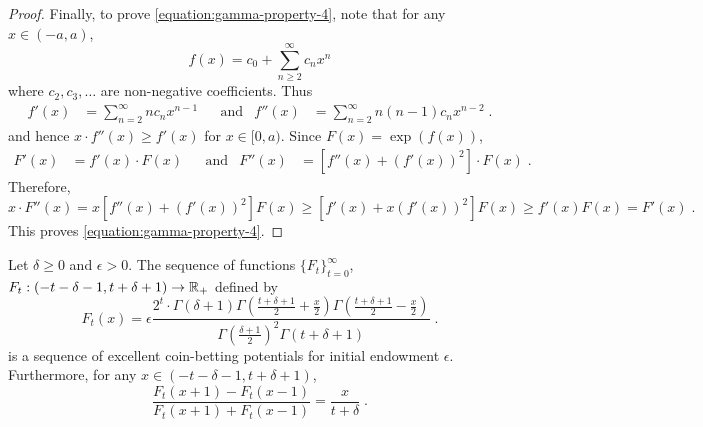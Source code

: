 \begin{proof}
Finally, to prove \eqref{equation:gamma-property-4}, note that
for any $x \in (-a,a)$,
$$
f(x) = c_0 + \sum_{n \ge 2}^\infty c_n x^n
$$
where $c_2, c_3, \dots$ are non-negative coefficients. Thus
\begin{align*}
f'(x) & = \sum_{n=2}^\infty n c_n x^{n-1} &
& \text{and} &
f''(x) & = \sum_{n=2}^\infty n (n-1) c_n x^{n-2} \; .
\end{align*}
and hence $x \cdot f''(x) \ge f'(x)$ for $x \in [0,a)$. Since $F(x) = \exp(f(x))$,
\begin{align*}
F'(x) & = f'(x) \cdot F(x) &
& \text{and} &
F''(x) & = \left[f''(x) + (f'(x))^2 \right] \cdot F(x) \; .
\end{align*}
Therefore,
$$
x \cdot F''(x) = x [f''(x) + (f'(x))^2] F(x) \ge [f'(x) + x (f'(x))^2] F(x) \ge f'(x) F(x) = F'(x) \; .
$$
This proves \eqref{equation:gamma-property-4}.
\end{proof}

\begin{theorem}[KT potential]
\label{theorem:kt-potential}
Let $\delta \ge 0$ and $\epsilon > 0$. The sequence of functions
$\{F_t\}_{t=0}^\infty$, $F_t:(-t-\delta-1, t+\delta+1) \to \mathbb{R}_+$ defined by
$$
F_t(x) = \epsilon \frac{2^t \cdot \Gamma(\delta + 1) \Gamma(\frac{t+\delta+1}{2} + \frac{x}{2}) \Gamma(\frac{t+\delta+1}{2} - \frac{x}{2})}{\Gamma(\frac{\delta+1}{2})^2 \Gamma(t+\delta+1)} \; .
$$
is a sequence of excellent coin-betting potentials for initial endowment $\epsilon$.
Furthermore, for any $x \in (-t-\delta-1, t+\delta+1)$,
\begin{equation}
\frac{F_t(x+1) - F_{t}(x-1)}{F_t(x+1) + F_{t}(x-1)} = \frac{x}{t+\delta} \; .
\end{equation}
\end{theorem}

